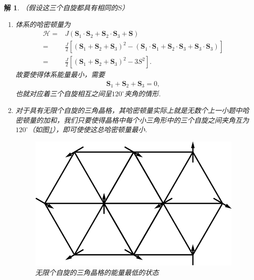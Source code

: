 \documentclass[UTF8,10pt,a4paper]{article}
\theoremstyle{Problem}
\theoremstyle{Solution}
\newtheorem*{sol}{解}
\begin{document}
\begin{sol}
    （假设这三个自旋都具有相同的$S$）
    \begin{enumerate}
        \item[(a)] 体系的哈密顿量为
        \begin{align}
            \nonumber\mathcal{H}=&J(\bm{S}_1\cdot\bm{S}_2+\bm{S}_2\cdot\bm{S}_3+\bm{S})\\
            \nonumber=&\frac{J}{2}[(\bm{S}_1+\bm{S}_2+\bm{S}_3)^2-(\bm{S}_1\cdot\bm{S}_1+\bm{S}_2\cdot\bm{S}_3+\bm{S}_3\cdot\bm{S}_3)]\\
            =&\frac{J}{2}[(\bm{S}_1+\bm{S}_2+\bm{S}_3)^2-3S^2].
        \end{align}
        故要使得体系能量最小，需要
        \begin{align}
            \bm{S}_1+\bm{S}_2+\bm{S}_3=0,
        \end{align}
        也就对应着三个自旋相互之间呈$120^{\circ}$夹角的情形.
        \item[(b)] 对于具有无限个自旋的三角晶格，其哈密顿量实际上就是无数个上一小题中哈密顿量的加和，我们只要使得晶格中每个小三角形中的三个自旋之间夹角互为$120^{\circ}$（如图\ref{5-InfiniteTriangleLattice}），即可使使这总哈密顿量最小.
        \begin{figure}[h]
            \centering
            \includegraphics[width=.5\textwidth]{5-InfiniteTriangleLattice.png}
            \caption{无限个自旋的三角晶格的能量最低的状态}
            \label{5-InfiniteTriangleLattice}
        \end{figure}
    \end{enumerate}
\end{sol}
\end{document}
